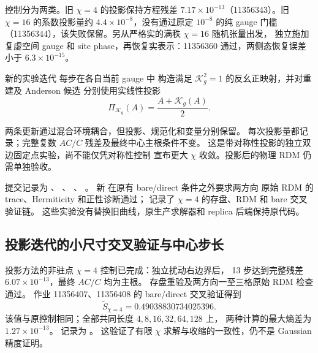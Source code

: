 控制分为两类。旧 $\chi=4$ 的投影保持方程残差
$7.17\times10^{-13}$（11356343）。旧 $\chi=16$ 的系数投影量约
$4.4\times10^{-8}$，没有通过原定 $10^{-8}$ 的纯 gauge 门槛
（11356344），该失败保留。另从严格实的满秩 $\chi=16$ 随机张量出发，
独立施加复虚空间 gauge 和 site phase，再恢复实表示：11356360
通过，两侧态恢复误差小于 $6.3\times10^{-15}$。

新的实验迭代  每步在各自当前 gauge 中
构造满足 $\mathcal K_g^2=1$ 的反幺正映射，并对重建及 Anderson 候选
分别使用实线性投影
\begin{equation}
 \Pi_{\mathcal K_g}(A)=\frac{A+\mathcal K_g(A)}2.
\end{equation}
\begin{center}
\end{center}
两条更新通过混合环境耦合，但投影、规范化和变量分别保留。
每次投影量都记录；完整复数 $AC/C$ 残差及最终中心主根条件不变。
这是带对称性投影的独立双边固定点实验，尚不能仅凭对称性控制
宣布更大 $\chi$ 收敛。投影后的物理 RDM 仍需单独验收。

提交记录为 、
、
、
。
新  在原有 bare/direct 条件之外要求两方向
原始 RDM 的 trace、Hermiticity 和正性诊断通过；
记录了 $\chi=4$ 的存盘、RDM 和 bare 交叉验证链。
这些实验没有替换旧曲线，原生产求解器和 replica 后端保持原代码。

\subsection{投影迭代的小尺寸交叉验证与中心步长}
投影方法的非驻点 $\chi=4$ 控制已完成：独立扰动右边界后，
13 步达到完整残差 $6.07\times10^{-13}$，最终 $AC/C$ 均为主根。
存盘重验及两方向一至三格原始 RDM 检查通过。
作业 11356407、11356408 的 bare/direct 交叉验证得到
\begin{equation}
 \widetilde S_{\chi=4}=0.49038830734025396.
\end{equation}
该值与原控制相同；全部共同长度 $4,8,16,32,64,128$ 上，
两种计算的最大熵差为 $1.27\times10^{-13}$。
记录为 。
这验证了有限 $\chi$ 求解与收缩的一致性，仍不是 Gaussian 精度证明。

